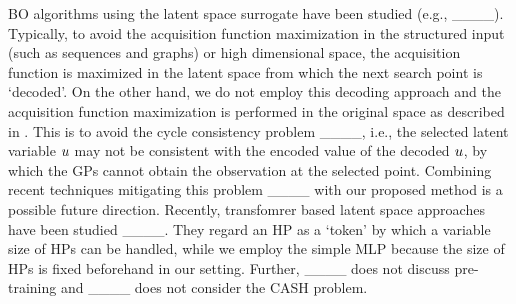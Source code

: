 

BO algorithms using the latent space surrogate have been studied (e.g., ____). 
%
Typically, to avoid the acquisition function maximization in the structured input (such as sequences and graphs) or high dimensional space, the acquisition function is maximized in the latent space from which the next search point is `decoded'. 
%
On the other hand, we do not employ this decoding approach and the acquisition function maximization is performed in the original space as described in .
%
This is to avoid the cycle consistency problem ____, i.e., the selected latent variable $\*u$ may not be consistent with the encoded value of the decoded $\*u$, by which the GPs cannot obtain the observation at the selected point.
%
Combining recent techniques mitigating this problem ____ with our proposed method is a possible future direction.
%
Recently, transfomrer based latent space approaches have been studied ____.
%
They regard an HP as a `token' by which a variable size of HPs can be handled, while we employ the simple MLP because the size of HPs is fixed beforehand in our setting.
%
Further, ____ does not discuss pre-training and ____ does not consider the CASH problem. 





%